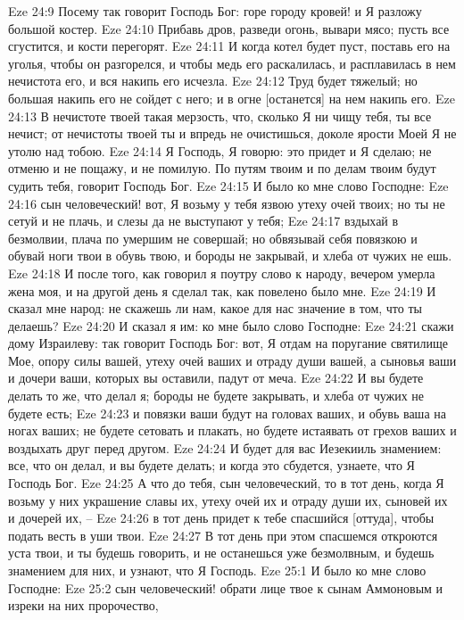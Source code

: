 Eze 24:9  Посему так говорит Господь Бог: горе городу кровей! и Я разложу большой костер.
Eze 24:10  Прибавь дров, разведи огонь, вывари мясо; пусть все сгустится, и кости перегорят.
Eze 24:11  И когда котел будет пуст, поставь его на уголья, чтобы он разгорелся, и чтобы медь его раскалилась, и расплавилась в нем нечистота его, и вся накипь его исчезла.
Eze 24:12  Труд будет тяжелый; но большая накипь его не сойдет с него; и в огне [останется] на нем накипь его.
Eze 24:13  В нечистоте твоей такая мерзость, что, сколько Я ни чищу тебя, ты все нечист; от нечистоты твоей ты и впредь не очистишься, доколе ярости Моей Я не утолю над тобою.
Eze 24:14  Я Господь, Я говорю: это придет и Я сделаю; не отменю и не пощажу, и не помилую. По путям твоим и по делам твоим будут судить тебя, говорит Господь Бог.
Eze 24:15  И было ко мне слово Господне:
Eze 24:16  сын человеческий! вот, Я возьму у тебя язвою утеху очей твоих; но ты не сетуй и не плачь, и слезы да не выступают у тебя;
Eze 24:17  вздыхай в безмолвии, плача по умершим не совершай; но обвязывай себя повязкою и обувай ноги твои в обувь твою, и бороды не закрывай, и хлеба от чужих не ешь.
Eze 24:18  И после того, как говорил я поутру слово к народу, вечером умерла жена моя, и на другой день я сделал так, как повелено было мне.
Eze 24:19  И сказал мне народ: не скажешь ли нам, какое для нас значение в том, что ты делаешь?
Eze 24:20  И сказал я им: ко мне было слово Господне:
Eze 24:21  скажи дому Израилеву: так говорит Господь Бог: вот, Я отдам на поругание святилище Мое, опору силы вашей, утеху очей ваших и отраду души вашей, а сыновья ваши и дочери ваши, которых вы оставили, падут от меча.
Eze 24:22  И вы будете делать то же, что делал я; бороды не будете закрывать, и хлеба от чужих не будете есть;
Eze 24:23  и повязки ваши будут на головах ваших, и обувь ваша на ногах ваших; не будете сетовать и плакать, но будете истаявать от грехов ваших и воздыхать друг перед другом.
Eze 24:24  И будет для вас Иезекииль знамением: все, что он делал, и вы будете делать; и когда это сбудется, узнаете, что Я Господь Бог.
Eze 24:25  А что до тебя, сын человеческий, то в тот день, когда Я возьму у них украшение славы их, утеху очей их и отраду души их, сыновей их и дочерей их, --
Eze 24:26  в тот день придет к тебе спасшийся [оттуда], чтобы подать весть в уши твои.
Eze 24:27  В тот день при этом спасшемся откроются уста твои, и ты будешь говорить, и не останешься уже безмолвным, и будешь знамением для них, и узнают, что Я Господь.
Eze 25:1  И было ко мне слово Господне:
Eze 25:2  сын человеческий! обрати лице твое к сынам Аммоновым и изреки на них пророчество,
